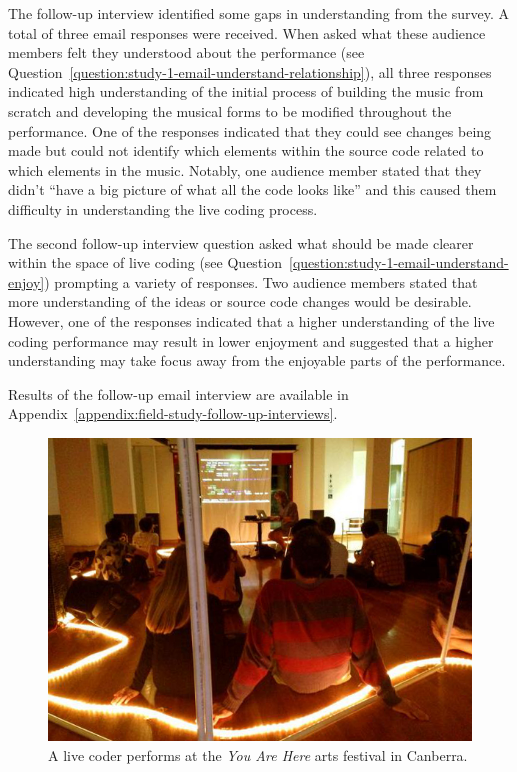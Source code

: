 The follow-up interview identified some gaps in understanding from the survey. A total of three email responses were received. When asked what these audience members felt they understood about the performance (see Question~\ref{question:study-1-email-understand-relationship}), all three responses indicated high understanding of the initial process of building the music from scratch and developing the musical forms to be modified throughout the performance. One of the responses indicated that they could see changes being made but could not identify which elements within the source code related to which elements in the music. Notably, one audience member stated that they didn't ``have a big picture of what all the code looks like'' and this caused them difficulty in understanding the live coding process. 

The second follow-up interview question asked what should be made clearer within the space of live coding (see Question~\ref{question:study-1-email-understand-enjoy}) prompting a variety of responses. Two audience members stated that more understanding of the ideas or source code changes would be desirable. However, one of the responses indicated that a higher understanding of the live coding performance may result in lower enjoyment and suggested that a higher understanding may take focus away from the enjoyable parts of the performance. 


Results of the follow-up email interview are available in Appendix~\ref{appendix:field-study-follow-up-interviews}.

\begin{figure}
\centering
\includegraphics[width=\textwidth]{../images/study-1-you-are-here.jpg}
\caption[A live coder performs at the \textit{You Are Here} arts festival]{A live coder performs at the \textit{You Are Here} arts festival in Canberra.}
\label{fig:you-are-here-performance}
\end{figure}

